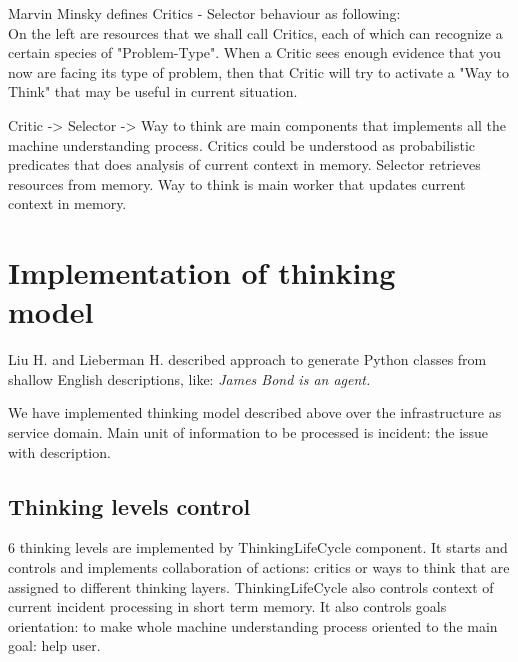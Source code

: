\documentclass{acm_proc_article-sp}
\begin{document}
{}

Marvin Minsky defines Critics - Selector behaviour as following:\\
On the left are resources that we shall call Critics, each of which can recognize a certain species of "Problem-Type". When a Critic sees enough evidence that you now are facing its type of problem, then that Critic will try to activate a "Way to Think" that may be useful in current situation.

Critic -> Selector -> Way to think are main components that implements all the machine understanding process. Critics could be understood as probabilistic predicates that does analysis of current context in memory. Selector retrieves resources from memory. Way to think is main worker that updates current context in memory.

{}

\section{Implementation of thinking\\ model}

Liu H. and Lieberman H.\cite{stories} described approach to generate Python classes from shallow English descriptions, like: \emph{James Bond is an agent.}

We have implemented thinking model described above over the infrastructure as service domain. Main unit of information to be processed is incident: the issue with description.

\subsection{Thinking levels control}

6 thinking levels are implemented by ThinkingLifeCycle component. It starts and controls and implements collaboration of actions: critics or ways to think that are assigned to different thinking layers. ThinkingLifeCycle also controls context of current incident processing in short term memory. It also controls goals orientation: to make whole machine understanding process oriented to the main goal: help user.\\
\end{document}
